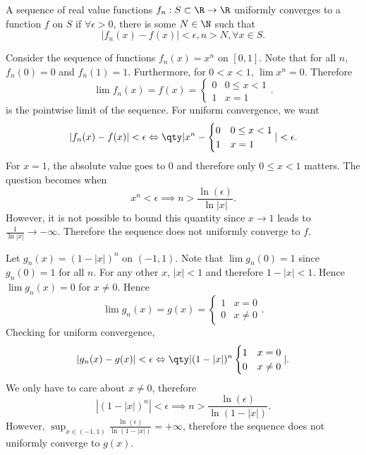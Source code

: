 \documentclass[../notes.tex]{subfiles}
\begin{document}
\begin{definition}
    A sequence of real value functions $f_n : S \subset \R \to \R$ uniformly converges to a function $f$ on $S$ if $\forall \epsilon > 0$, there is some $N \in \N$ such that
    \[
        |f_n(x) - f(x)| < \epsilon, n > N, \forall x \in S
    .\]
\end{definition}

\begin{example}
    Consider the sequence of functions $f_n(x) = x^n$ on $[0,1]$. Note that for all $n$, $f_n(0) = 0$ and $f_n(1) = 1$. Furthermore, for $0 < x < 1$, $\lim x^n = 0$. Therefore
    \[
        \lim f_n(x) = f(x) = \begin{cases}
            0 & 0 \leq x < 1 \\
            1 & x = 1
        \end{cases}
    .\]
    is the pointwise limit of the sequence. For uniform convergence, we want
    \[
        |f_n(x) - f(x)| < \epsilon \Leftrightarrow \qty|x^n - \begin{cases}
            0 & 0 \leq x < 1 \\
            1 & x = 1
        \end{cases}| < \epsilon
    .\]
    For $x = 1$, the absolute value goes to $0$ and therefore only $0 \leq x < 1$ matters. The question becomes when
    \[
        x^n < \epsilon \implies n > \frac{\ln(\epsilon)}{\ln|x|}
    .\]
    However, it is not possible to bound this quantity since $x \to 1$ leads to $\frac{1}{\ln|x|} \to -\infty$. Therefore the sequence does not uniformly converge to $f$.
\end{example}

\begin{example}
    Let $g_n(x) = (1 - |x|)^n$ on $(-1, 1)$. Note that $\lim g_n(0) = 1$ since $g_n(0) = 1$ for all $n$. For any other $x$, $|x| < 1$ and therefore $1 - |x| < 1$. Hence $\lim g_n(x) = 0$ for $x \neq 0$. Hence
    \[
        \lim g_n(x) = g(x) = \begin{cases}
            1 & x = 0 \\
            0 & x \neq 0
        \end{cases}
    .\]
    Checking for uniform convergence,
    \[
        |g_n(x) - g(x)| < \epsilon \Leftrightarrow \qty| (1-|x|)^n
        \begin{cases}
            1 & x = 0 \\
            0 & x \neq 0
        \end{cases}
        |
    .\]
    We only have to care about $x \neq 0$, therefore
    \[
        |(1-|x|)^n| < \epsilon \implies n > \frac{\ln(\epsilon)}{\ln(1-|x|)}
    .\]
    However, $\sup_{x\in (-1,1)} \frac{\ln(\epsilon)}{\ln(1-|x|)} = +\infty$, therefore the sequence does not uniformly converge to $g(x)$.
\end{example}
\end{document}
